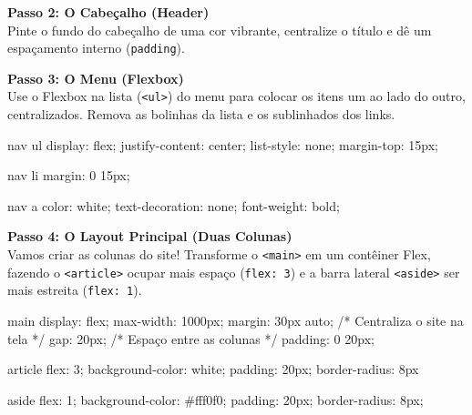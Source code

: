 \documentclass[12pt,a4paper]{article}
\begin{document}

\noindent\textbf{Passo 2: O Cabeçalho (Header)}\\
Pinte o fundo do cabeçalho de uma cor vibrante, centralize o título e dê um espaçamento interno (\verb|padding|).


\noindent\textbf{Passo 3: O Menu (Flexbox)}\\
Use o Flexbox na lista (\verb|<ul>|) do menu para colocar os itens um ao lado do outro, centralizados. Remova as bolinhas da lista e os sublinhados dos links.

\begin{codecss}
nav ul {
    display: flex;
    justify-content: center;
    list-style: none;
    margin-top: 15px;
}

nav li {
    margin: 0 15px;
}

nav a {
    color: white;
    text-decoration: none;
    font-weight: bold;
}
\end{codecss}

\noindent\textbf{Passo 4: O Layout Principal (Duas Colunas)}\\
Vamos criar as colunas do site! Transforme o \verb|<main>| em um contêiner Flex, fazendo o \verb|<article>| ocupar mais espaço (\verb|flex: 3|) e a barra lateral \verb|<aside>| ser mais estreita (\verb|flex: 1|).

\begin{codecss}
main {
    display: flex;
    max-width: 1000px;
    margin: 30px auto; /* Centraliza o site na tela */
    gap: 20px;         /* Espaço entre as colunas */
    padding: 0 20px;
}

article {
    flex: 3;
    background-color: white;
    padding: 20px;
    border-radius: 8px
}

aside {
    flex: 1;
    background-color: #fff0f0;
    padding: 20px;
    border-radius: 8px;
}
\end{codecss}
\end{document}
